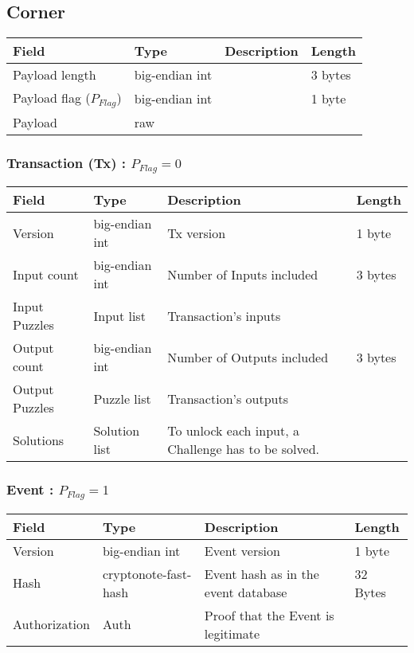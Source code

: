 \documentclass[a4paper,10pt]{article}
\begin{document}
        \subsection{Corner}
           \begin{tabularx}{\textwidth}{|l|l|X|l|}
            \hline Field & Type & Description & Length \\ \hline
            \hline Payload length & big-endian int &  & 3 bytes \\
            \hline Payload flag ($P_{Flag}$) & big-endian int &  & 1 byte \\
            \hline Payload & raw & & \\
            \hline
            \end{tabularx}
            \subsubsection{Transaction (Tx) :  $P_{Flag} = 0$}
                \begin{tabularx}{\textwidth}{|l|l|X|l|}
                \hline Field & Type & Description & Length \\ \hline
                \hline Version & big-endian int & Tx version & 1 byte \\
                \hline Input count & big-endian int & Number of Inputs included & 3 bytes\\
                \hline Input Puzzles & Input list & Transaction's inputs & \\
                \hline Output count & big-endian int & Number of Outputs included & 3 bytes\\
                \hline Output Puzzles & Puzzle list & Transaction's outputs & \\
                \hline Solutions & Solution list & To unlock each input, a Challenge has to be solved. & \\
                \hline
                \end{tabularx}
            \subsubsection{Event : $P_{Flag} = 1$}
                \begin{tabularx}{\textwidth}{|l|l|X|l|}
                \hline Field & Type & Description & Length \\ \hline
                \hline Version & big-endian int & Event version & 1 byte \\
                \hline Hash & cryptonote-fast-hash & Event hash as in the event database & 32 Bytes\\
                \hline Authorization & Auth & Proof that the Event is legitimate & \\
                \hline
                \end{tabularx}
\end{document}
